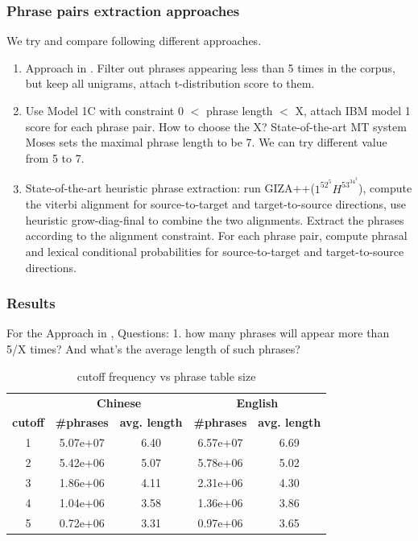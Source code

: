 \documentclass[11pt, letterpaper]{article}   	%
\begin{document}
\subsubsection{Phrase pairs extraction approaches}
We try and compare following different approaches.

\begin{enumerate}
\item Approach in \cite{marcu-wong-02}. Filter out phrases appearing less than 5 times in the corpus, but keep all unigrams, attach t-distribution score to them.

\item Use Model 1C with constraint 0 $<$ phrase length $<$ X, attach IBM model 1 score for each phrase pair. How to choose the X? State-of-the-art MT system Moses\cite{moses-07} sets the maximal phrase length to be 7. We can try different value from 5 to 7.

\item State-of-the-art heuristic phrase extraction: run GIZA++($1^52^5H^53^34^3$), compute the viterbi alignment for source-to-target and target-to-source directions, use heuristic grow-diag-final to combine the two alignments. Extract the phrases according to the alignment constraint. For each phrase pair, compute phrasal and lexical conditional probabilities for source-to-target and target-to-source directions.
\end{enumerate}

\subsubsection{Results}
For the Approach in \cite{marcu-wong-02},
Questions: 1. how many phrases will appear more than 5/X times? And what's the average length of such phrases?  

\begin{table}
\centering
\begin{tabular}{ c | c | c | c | c }
 & \multicolumn{2}{c}{\bf{Chinese}} & \multicolumn{2}{|c}{\bf{English}}  \\
  \cline{2-5} 
  \bf{cutoff} & \bf{\#phrases} & \bf{avg. length} & \bf{\#phrases} & \bf{avg. length} \\
  \hline
  1 & 5.07e+07  & 6.40 & 6.57e+07 & 6.69  \\
  \hline
  2 & 5.42e+06 & 5.07 &5.78e+06 & 5.02\\
  \hline
  3 & 1.86e+06  & 4.11 & 2.31e+06& 4.30\\
  \hline
  4 & 1.04e+06 & 3.58 &1.36e+06 &3.86\\
 \hline
  5 & 0.72e+06 & 3.31 & 0.97e+06&3.65\\
 \end{tabular}
 \caption{cutoff frequency vs phrase table size}
  \label{tab:phrase-cutoff}
\end{table}
\end{document}
